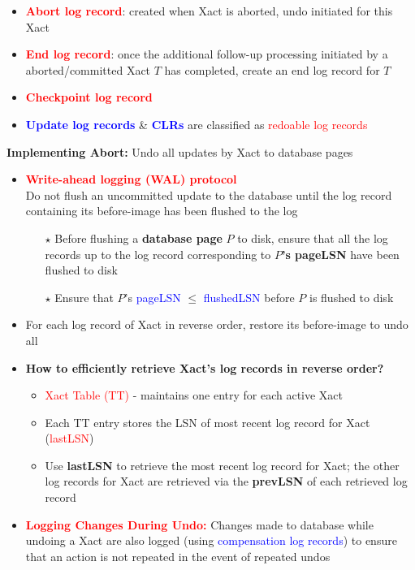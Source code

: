\documentclass[10pt,landscape]{article}
\newcommand{\1}{\mathmybb{1}}
\begin{document}
\begin{multicols*}{3}
\begin{itemize}
    \item \textcolor{red}{\textbf{Abort log record}}: created when Xact is aborted, undo initiated for this Xact
    \item \textcolor{red}{\textbf{End log record}}: once the additional follow-up processing initiated by a aborted/committed Xact $T$ has completed, create an end log record for $T$
    \item \textcolor{red}{\textbf{Checkpoint log record}}
    \item \textcolor{blue}{\textbf{Update log records}} \& \textcolor{blue}{\textbf{CLRs}} are classified as \textcolor{red}{redoable log records}
\end{itemize}

\textbf{Implementing Abort:} Undo all updates by Xact to database pages
\begin{itemize}
    \item \textcolor{red}{\textbf{Write-ahead logging (WAL) protocol}} \\
    Do not flush an uncommitted update to the database until the log record containing its before-image has been flushed to the log
    \begin{itemize}
        \item[$\star$] Before flushing a \textbf{database page} $P$ to disk, ensure that all the log records up to the log record corresponding to \textbf{$P$'s pageLSN} have been flushed to disk
        \item[$\star$] Ensure that $P$'s \textcolor{blue}{pageLSN} $\leq$ \textcolor{blue}{flushedLSN} before $P$ is flushed to disk
    \end{itemize}
    \item For each log record of Xact in reverse order, restore its before-image to undo all
    \item \textbf{How to efficiently retrieve Xact's log records in reverse order?}
    \begin{itemize}
        \item \textcolor{red}{Xact Table (TT)} - maintains one entry for each active Xact
        \item Each TT entry stores the LSN of most recent log record for Xact (\textcolor{red}{lastLSN})
        \item Use \textbf{lastLSN} to retrieve the most recent log record for Xact; the other log records for Xact are retrieved via the \textbf{prevLSN} of each retrieved log record
    \end{itemize}
    \item \textcolor{red}{\textbf{Logging Changes During Undo:}} Changes made to database while undoing a Xact are also logged (using \textcolor{blue}{compensation log records}) to ensure that an action is not repeated in the event of repeated undos
\end{itemize}


\end{multicols*}
\end{document}
